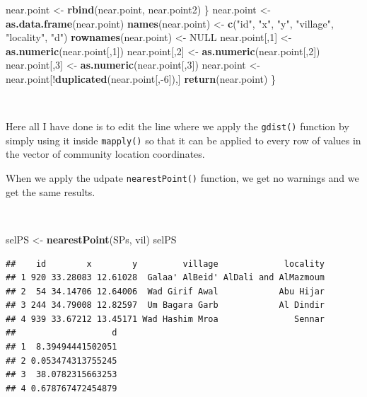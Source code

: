 \documentclass[11pt,a4paper]{article}
\newenvironment{Shaded}{}{}
\newcommand{\KeywordTok}[1]{\textcolor[rgb]{0.00,0.44,0.13}{\textbf{#1}}}
\newcommand{\DecValTok}[1]{\textcolor[rgb]{0.25,0.63,0.44}{#1}}
\newcommand{\StringTok}[1]{\textcolor[rgb]{0.25,0.44,0.63}{#1}}
\newcommand{\OtherTok}[1]{\textcolor[rgb]{0.00,0.44,0.13}{#1}}
\newcommand{\OperatorTok}[1]{\textcolor[rgb]{0.40,0.40,0.40}{#1}}
\newcommand{\NormalTok}[1]{#1}
\begin{document}
\begin{Shaded}
\begin{Highlighting}[]
\NormalTok{      near.point <-}\StringTok{ }\KeywordTok{rbind}\NormalTok{(near.point, near.point2)}
\NormalTok{    \}}
\NormalTok{  near.point <-}\StringTok{ }\KeywordTok{as.data.frame}\NormalTok{(near.point)}
    \KeywordTok{names}\NormalTok{(near.point) <-}\StringTok{ }\KeywordTok{c}\NormalTok{(}\StringTok{"id"}\NormalTok{, }\StringTok{"x"}\NormalTok{, }\StringTok{"y"}\NormalTok{, }\StringTok{"village"}\NormalTok{, }\StringTok{"locality"}\NormalTok{, }\StringTok{"d"}\NormalTok{) }
    \KeywordTok{rownames}\NormalTok{(near.point) <-}\StringTok{ }\OtherTok{NULL}  
\NormalTok{    near.point[,}\DecValTok{1}\NormalTok{] <-}\StringTok{ }\KeywordTok{as.numeric}\NormalTok{(near.point[,}\DecValTok{1}\NormalTok{])}
\NormalTok{    near.point[,}\DecValTok{2}\NormalTok{] <-}\StringTok{ }\KeywordTok{as.numeric}\NormalTok{(near.point[,}\DecValTok{2}\NormalTok{])}
\NormalTok{    near.point[,}\DecValTok{3}\NormalTok{] <-}\StringTok{ }\KeywordTok{as.numeric}\NormalTok{(near.point[,}\DecValTok{3}\NormalTok{]) }
\NormalTok{    near.point <-}\StringTok{ }\NormalTok{near.point[}\OperatorTok{!}\KeywordTok{duplicated}\NormalTok{(near.point[,}\OperatorTok{-}\DecValTok{6}\NormalTok{]),]}
    \KeywordTok{return}\NormalTok{(near.point)}
\NormalTok{\}}
\end{Highlighting}
\end{Shaded}

~

Here all I have done is to edit the line where we apply the
\texttt{gdist()} function by simply using it inside \texttt{mapply()} so
that it can be applied to every row of values in the vector of community
location coordinates.

When we apply the udpate \texttt{nearestPoint()} function, we get no
warnings and we get the same results.

~

\begin{Shaded}
\begin{Highlighting}[]
\NormalTok{selPS <-}\StringTok{ }\KeywordTok{nearestPoint}\NormalTok{(SPs, vil)}
\NormalTok{selPS}
\end{Highlighting}
\end{Shaded}

\begin{verbatim}
##    id        x        y         village             locality
## 1 920 33.28083 12.61028  Galaa' AlBeid' AlDali and AlMazmoum
## 2  54 34.14706 12.64006  Wad Girif Awal            Abu Hijar
## 3 244 34.79008 12.82597  Um Bagara Garb            Al Dindir
## 4 939 33.67212 13.45171 Wad Hashim Mroa               Sennar
##                   d
## 1  8.39494441502051
## 2 0.053474313755245
## 3  38.0782315663253
## 4 0.678767472454879
\end{verbatim}
\end{document}
